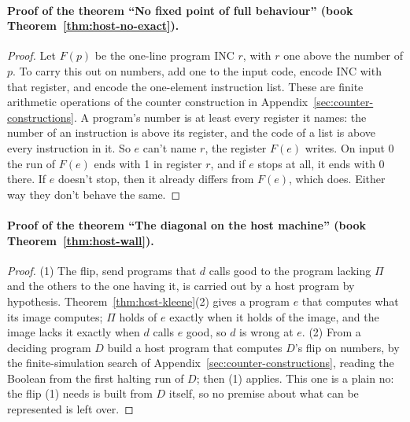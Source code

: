 \documentclass[11pt,twoside]{article}
\theoremstyle{thielethm}
\theoremstyle{thieledef}
\theoremstyle{thieledef}
\theoremstyle{thieledef}
\theoremstyle{thielethm}
\theoremstyle{thieleobs}
\theoremstyle{thielethm}
\begin{document}
\paragraph{Proof of the theorem ``No fixed point of full behaviour'' (book Theorem~\ref{thm:host-no-exact}).}
\begin{proof}
Let $F(p)$ be the one-line program INC $r$, with $r$ one above the number of $p$. To carry this out on numbers, add one to the input code, encode INC with that register,
and encode the one-element instruction list. These are finite arithmetic operations of the
counter construction in Appendix~\ref{sec:counter-constructions}. A program's number is at
least every register it names: the number of an instruction is above its register, and the code of a
list is above every instruction in it. So $e$ can't name $r$, the register $F(e)$ writes. On input 0 the
run of $F(e)$ ends with 1 in register $r$, and if $e$ stops at all, it ends with 0 there. If $e$ doesn't
stop, then it already differs from $F(e)$, which does. Either way they don't behave the same.
\end{proof}

\paragraph{Proof of the theorem ``The diagonal on the host machine'' (book Theorem~\ref{thm:host-wall}).}
\begin{proof}
(1) The flip, send programs that $d$ calls good to the program lacking $\Pi$ and the others to the
one having it, is carried out by a host program by hypothesis. Theorem~\ref{thm:host-kleene}(2) gives
a program $e$ that computes what its image computes; $\Pi$ holds of $e$ exactly when it holds of the
image, and the image lacks it exactly when $d$ calls $e$ good, so $d$ is wrong at $e$. (2) From
a deciding program $D$ build a host program that computes $D$'s flip on numbers, by the finite-simulation search of Appendix~\ref{sec:counter-constructions}, reading the
Boolean from the first halting run of $D$; then (1) applies. This one is a plain no: the flip (1) needs is built from $D$ itself, so no premise about what can be represented is left over.
\end{proof}
\end{document}
